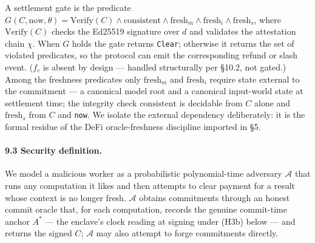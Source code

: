 \documentclass[11pt]{article}
\begin{document}
A settlement gate is the predicate $G(C, \mathrm{now}, \theta) = \mathrm{Verify}(C) \wedge \mathrm{consistent} \wedge \mathrm{fresh}_m \wedge \mathrm{fresh}_i \wedge \mathrm{fresh}_s$, where $\mathrm{Verify}(C)$ checks the Ed25519 signature over $d$ and validates the attestation chain $\chi$. When $G$ holds the gate returns \texttt{Clear}; otherwise it returns the set of violated predicates, so the protocol can emit the corresponding refund or slash event. ($f_c$ is absent by design --- handled structurally per \S10.2, not gated.) Among the freshness predicates only $\mathrm{fresh}_m$ and $\mathrm{fresh}_i$ require state external to the commitment --- a canonical model root and a canonical input-world state at settlement time; the integrity check $\mathrm{consistent}$ is decidable from $C$ alone and $\mathrm{fresh}_s$ from $C$ and \texttt{now}. We isolate the external dependency deliberately: it is the formal residue of the DeFi oracle-freshness discipline imported in \S5.

\paragraph{9.3 Security definition.} We model a malicious worker as a probabilistic polynomial-time adversary $\mathcal{A}$ that runs any computation it likes and then attempts to clear payment for a result whose context is no longer fresh. $\mathcal{A}$ obtains commitments through an honest commit oracle that, for each computation, records the genuine commit-time anchor $A^*$ --- the enclave's clock reading at signing under (H3b) below --- and returns the signed $C$; $\mathcal{A}$ may also attempt to forge commitments directly.
\end{document}
